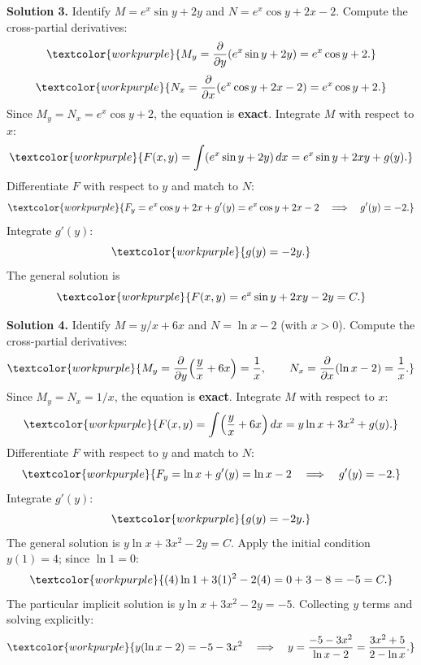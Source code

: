 \medskip

\noindent\textbf{Solution 3.}\quad
Identify $M = e^x\sin y + 2y$ and $N = e^x\cos y + 2x - 2$.
Compute the cross-partial derivatives:
\[
  \textcolor{workpurple}{M_y
  = \frac{\partial}{\partial y}(e^x\sin y + 2y)
  = e^x\cos y + 2.}
\]
\[
  \textcolor{workpurple}{N_x
  = \frac{\partial}{\partial x}(e^x\cos y + 2x - 2)
  = e^x\cos y + 2.}
\]
Since $M_y = N_x = e^x\cos y + 2$, the equation is \textbf{exact}.
Integrate $M$ with respect to $x$:
\[
  \textcolor{workpurple}{F(x,y)
  = \int(e^x\sin y + 2y)\,dx
  = e^x\sin y + 2xy + g(y).}
\]
Differentiate $F$ with respect to $y$ and match to $N$:
\[
  \textcolor{workpurple}{F_y = e^x\cos y + 2x + g'(y)
  = e^x\cos y + 2x - 2
  \quad\Longrightarrow\quad g'(y) = -2.}
\]
Integrate $g'(y)$:
\[
  \textcolor{workpurple}{g(y) = -2y.}
\]
The general solution is
\[
  \textcolor{workpurple}{F(x,y) = e^x\sin y + 2xy - 2y = C.}
\]

\medskip

\noindent\textbf{Solution 4.}\quad
Identify $M = y/x + 6x$ and $N = \ln x - 2$ (with $x>0$).
Compute the cross-partial derivatives:
\[
  \textcolor{workpurple}{M_y
  = \frac{\partial}{\partial y}\!\left(\frac{y}{x} + 6x\right)
  = \frac{1}{x},
  \qquad
  N_x
  = \frac{\partial}{\partial x}(\ln x - 2)
  = \frac{1}{x}.}
\]
Since $M_y = N_x = 1/x$, the equation is \textbf{exact}.
Integrate $M$ with respect to $x$:
\[
  \textcolor{workpurple}{F(x,y)
  = \int\!\left(\frac{y}{x} + 6x\right)dx
  = y\ln x + 3x^2 + g(y).}
\]
Differentiate $F$ with respect to $y$ and match to $N$:
\[
  \textcolor{workpurple}{F_y = \ln x + g'(y) = \ln x - 2
  \quad\Longrightarrow\quad g'(y) = -2.}
\]
Integrate $g'(y)$:
\[
  \textcolor{workpurple}{g(y) = -2y.}
\]
The general solution is $y\ln x + 3x^2 - 2y = C$.
Apply the initial condition $y(1) = 4$; since $\ln 1 = 0$:
\[
  \textcolor{workpurple}{(4)\ln 1 + 3(1)^2 - 2(4)
  = 0 + 3 - 8 = -5 = C.}
\]
The particular implicit solution is $y\ln x + 3x^2 - 2y = -5$.
Collecting $y$ terms and solving explicitly:
\[
  \textcolor{workpurple}{y(\ln x - 2) = -5 - 3x^2
  \quad\Longrightarrow\quad
  y = \frac{-5 - 3x^2}{\ln x - 2} = \frac{3x^2 + 5}{2 - \ln x}.}
\]

\medskip

